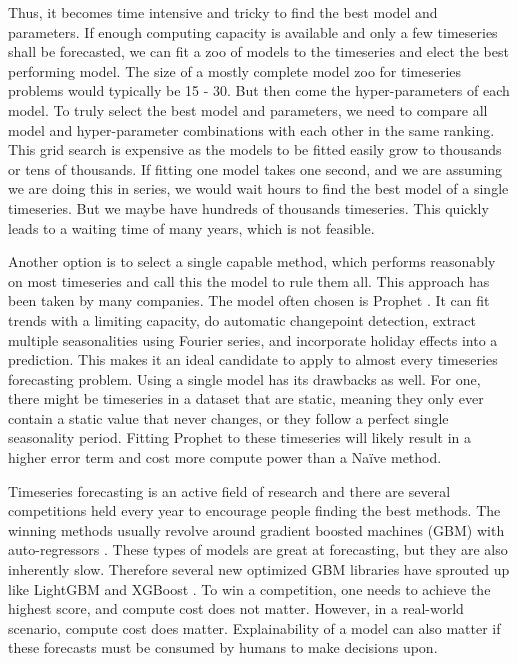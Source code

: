Thus, it becomes time intensive and tricky to find the best model and parameters. If enough computing capacity is available and only a few timeseries shall be forecasted, we can fit a zoo of models to the timeseries and elect the best performing model. The size of a mostly complete model zoo for timeseries problems would typically be 15 - 30. But then come the hyper-parameters of each model. To truly select the best model and parameters, we need to compare all model and hyper-parameter combinations with each other in the same ranking. This grid search is expensive as the models to be fitted easily grow to thousands or tens of thousands. If fitting one model takes one second, and we are assuming we are doing this in series, we would wait hours to find the best model of a single timeseries. But we maybe have hundreds of thousands timeseries. This quickly leads to a waiting time of many years, which is not feasible. 

Another option is to select a single capable method, which performs reasonably on most timeseries and call this the model to rule them all. This approach has been taken by many companies. The model often chosen is Prophet \cite{prophet}. It can fit trends with a limiting capacity, do automatic changepoint detection, extract multiple seasonalities using Fourier series, and incorporate holiday effects into a prediction. This makes it an ideal candidate to apply to almost every timeseries forecasting problem. Using a single model has its drawbacks as well. For one, there might be timeseries in a dataset that are static, meaning they only ever contain a static value that never changes, or they follow a perfect single seasonality period. Fitting Prophet to these timeseries will likely result in a higher error term and cost more compute power than a Na\"ive method.

Timeseries forecasting is an active field of research and there are several competitions held every year to encourage people finding the best methods. The winning methods usually revolve around gradient boosted machines (GBM) with auto-regressors \cite{gbm}. These types of models are great at forecasting, but they are also inherently slow. Therefore several new optimized GBM libraries have sprouted up like LightGBM \cite{lightgbm} and XGBoost \cite{xgboost}. To win a competition, one needs to achieve the highest score, and compute cost does not matter. However, in a real-world scenario, compute cost does matter. Explainability of a model can also matter if these forecasts must be consumed by humans to make decisions upon.

